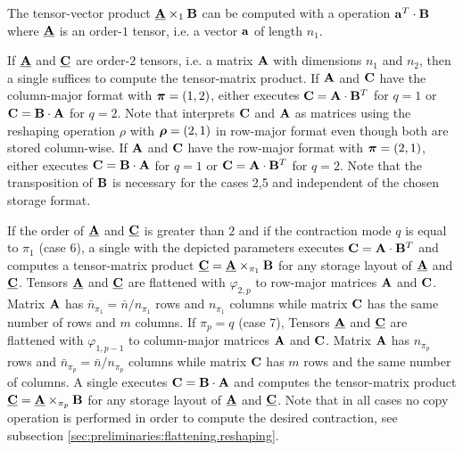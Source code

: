 




The tensor-vector product $\underline{\mathbf{A}} \times_1 \mathbf{B}$ can be computed with a  operation $\mathbf{a}^T \cdot \mathbf{B}$ where $\underline{\mathbf{A}}$ is an order-$1$ tensor, i.e. a vector $\mathbf{a}$ of length $n_1$.

If $\underline{\mathbf{A}}$ and $\underline{\mathbf{C}}$ are order-$2$ tensors, i.e. a matrix $\mathbf{A}$ with dimensions $n_1$ and $n_2$, then a single  suffices to compute the tensor-matrix product. 
If $\mathbf{A}$ and $\mathbf{C}$ have the column-major format with $\boldsymbol{\pi}=(1,2)$,  either executes $\mathbf{C} = \mathbf{A} \cdot \mathbf{B}^T$ for $q =1$ or $\mathbf{C} = \mathbf{B} \cdot \mathbf{A}$ for $q=2$.
Note that  interprets $\mathbf{C}$ and $\mathbf{A}$ as matrices using the reshaping operation $\rho$ with $\boldsymbol{\rho} = (2,1)$ in row-major format even though both are stored column-wise.
If $\mathbf{A}$ and $\mathbf{C}$ have the row-major format with $\boldsymbol{\pi}=(2,1)$,  either executes $\mathbf{C} = \mathbf{B} \cdot \mathbf{A}$ for $q =1$ or $\mathbf{C} = \mathbf{A} \cdot \mathbf{B}^T$ for $q=2$. 
Note that the transposition of $\mathbf{B}$ is necessary for the cases 2,5 and independent of the chosen storage format.

If the order of $\underline{\mathbf{A}}$ and $\underline{\mathbf{C}}$ is greater than $2$ and if the contraction mode $q$ is equal to $\pi_1$ (case 6), a single  with the depicted parameters executes $\mathbf{C} = \mathbf{A} \cdot \mathbf{B}^T$ and computes a tensor-matrix product $\underline{\mathbf{C}} = \underline{\mathbf{A}} \times_{\pi_1} \mathbf{B}$ for any storage layout of $\underline{\mathbf{A}}$ and $\underline{\mathbf{C}}$.
Tensors $\underline{\mathbf{A}}$ and $\underline{\mathbf{C}}$ are flattened with $\varphi_{2,p}$ to row-major matrices $\mathbf{A}$ and $\mathbf{C}$.
Matrix $\mathbf{A}$ has $\bar{n}_{\pi_1} = \bar{n} / n_{\pi_1}$ rows and $n_{\pi_1}$ columns while matrix $\mathbf{C}$ has the same number of rows and $m$ columns.
If $\pi_p=q$ (case 7), Tensors $\underline{\mathbf{A}}$ and $\underline{\mathbf{C}}$ are flattened with $\varphi_{1,p-1}$ to column-major matrices $\mathbf{A}$ and $\mathbf{C}$.
Matrix $\mathbf{A}$ has $n_{\pi_p}$ rows and $\bar{n}_{\pi_p} =  \bar{n} / n_{\pi_p}$ columns while matrix $\mathbf{C}$ has $m$ rows and the same number of columns.
A single  executes $\mathbf{C} = \mathbf{B} \cdot \mathbf{A}$ and computes the tensor-matrix product $\underline{\mathbf{C}} = \underline{\mathbf{A}} \times_{\pi_p} \mathbf{B}$ for any storage layout of $\underline{\mathbf{A}}$ and $\underline{\mathbf{C}}$.
Note that in all cases no copy operation is performed in order to compute the desired contraction, see subsection \ref{sec:preliminaries:flattening.reshaping}.

